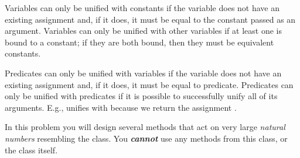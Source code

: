 Variables can only be unified with constants if the variable does not have an existing assignment and, if it does, it must be equal to the constant passed as an argument. Variables can only be unified with other variables if at least one is bound to a constant; if they are both bound, then they must be equivalent constants. 

Predicates can only be unified with variables if the variable does not have an existing assignment and, if it does, it must be equal to  predicate. Predicates can only be unified with predicates if it is possible to successfully unify all of its arguments. E.g.,  unifies with  because we return the assignment . 

In this problem you will design several methods that act on very large \emph{natural numbers} resembling the  class. You \emph{\textbf{cannot}} use any methods from this class, or the class itself. 

